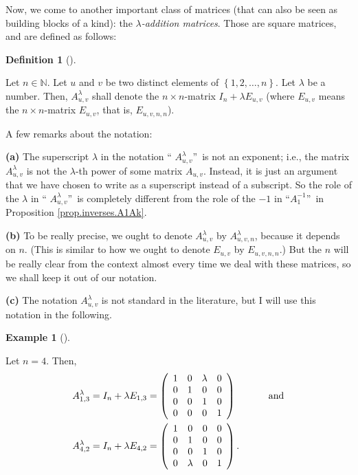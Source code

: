 \documentclass[numbers=enddot,12pt,final,onecolumn,notitlepage]{scrartcl}%
\theoremstyle{definition}
\newtheorem{defi}[theo]{Definition}
\newenvironment{definition}[1][]
{\begin{defi}[#1]\begin{leftbar}}
{\end{leftbar}\end{defi}}
\newtheorem{exam}[theo]{Example}
\newenvironment{example}[1][]
{\begin{exam}[#1]\begin{leftbar}}
{\end{leftbar}\end{exam}}
\begin{document}
Now, we come to another important class of matrices (that can also be seen as
building blocks of a kind): the $\lambda$\textit{-addition matrices}. Those
are square matrices, and are defined as follows:

\begin{definition}
\label{def.Alamuv}Let $n\in\mathbb{N}$. Let $u$ and $v$ be two distinct
elements of $\left\{  1,2,\ldots,n\right\}  $. Let $\lambda$ be a number.
Then, $A_{u,v}^{\lambda}$ shall denote the $n\times n$-matrix $I_{n}+\lambda
E_{u,v}$ (where $E_{u,v}$ means the $n\times n$-matrix $E_{u,v}$, that is,
$E_{u,v,n,n}$).

A few remarks about the notation:

\textbf{(a)} The superscript $\lambda$ in the notation \textquotedblleft%
$A_{u,v}^{\lambda}$\textquotedblright\ is not an exponent; i.e., the matrix
$A_{u,v}^{\lambda}$ is not the $\lambda$-th power of some matrix $A_{u,v}$.
Instead, it is just an argument that we have chosen to write as a superscript
instead of a subscript. So the role of the $\lambda$ in \textquotedblleft%
$A_{u,v}^{\lambda}$\textquotedblright\ is completely different from the role
of the $-1$ in \textquotedblleft$A_{1}^{-1}$\textquotedblright\ in Proposition
\ref{prop.inverses.A1Ak}.

\textbf{(b)} To be really precise, we ought to denote $A_{u,v}^{\lambda}$ by
$A_{u,v,n}^{\lambda}$, because it depends on $n$. (This is similar to how we
ought to denote $E_{u,v}$ by $E_{u,v,n,n}$.) But the $n$ will be really clear
from the context almost every time we deal with these matrices, so we shall
keep it out of our notation.

\textbf{(c)} The notation $A_{u,v}^{\lambda}$ is not standard in the
literature, but I will use this notation in the following.
\end{definition}

\begin{example}
\label{exam.Alamuv}Let $n=4$. Then,%
\begin{align*}
A_{1,3}^{\lambda}  &  =I_{n}+\lambda E_{1,3}=\left(
\begin{array}
[c]{cccc}%
1 & 0 & \lambda & 0\\
0 & 1 & 0 & 0\\
0 & 0 & 1 & 0\\
0 & 0 & 0 & 1
\end{array}
\right)  \ \ \ \ \ \ \ \ \ \ \text{and}\\
A_{4,2}^{\lambda}  &  =I_{n}+\lambda E_{4,2}=\left(
\begin{array}
[c]{cccc}%
1 & 0 & 0 & 0\\
0 & 1 & 0 & 0\\
0 & 0 & 1 & 0\\
0 & \lambda & 0 & 1
\end{array}
\right)  .
\end{align*}

\end{example}
\end{document}
